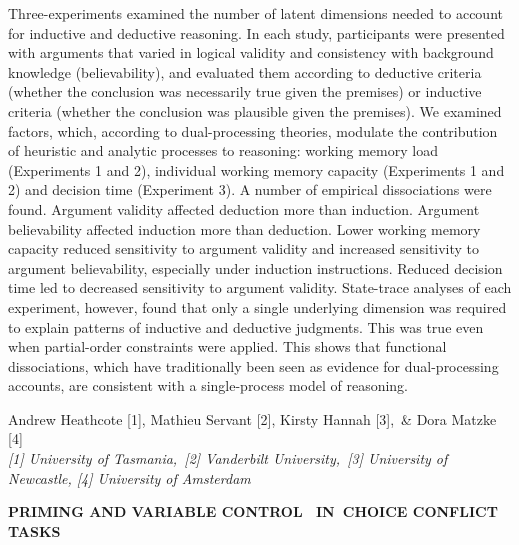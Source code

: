 \documentclass[]{article}
\begin{document}
Three-experiments examined the number of latent dimensions needed to
account for inductive and deductive reasoning. In each study,
participants were presented with arguments that varied in logical
validity and consistency with background knowledge (believability), and
evaluated them according to deductive criteria (whether the conclusion
was necessarily true given the premises) or inductive criteria (whether
the conclusion was plausible given the premises). We examined factors,
which, according to dual-processing theories, modulate the contribution
of heuristic and analytic processes to reasoning: working memory load
(Experiments 1 and 2), individual working memory capacity (Experiments 1
and 2) and decision time (Experiment 3). A number of empirical
dissociations were found. Argument validity affected deduction more than
induction. Argument believability affected induction more than
deduction. Lower working memory capacity reduced sensitivity to argument
validity and increased sensitivity to argument believability, especially
under induction instructions. Reduced decision time led to decreased
sensitivity to argument validity. State-trace analyses of each
experiment, however, found that only a single underlying dimension was
required to explain patterns of inductive and deductive judgments. This
was true even when partial-order constraints were applied. This shows
that functional dissociations, which have traditionally been seen as
evidence for dual-processing accounts, are consistent with a
single-process model of reasoning.\\
\pagebreak  

Andrew Heathcote {[}1{]}, Mathieu Servant {[}2{]}, Kirsty Hannah
{[}3{]},~\& Dora Matzke {[}4{]}\\
\emph{{[}1{]} University of Tasmania,~{[}2{]} Vanderbilt
University,~{[}3{]} University of Newcastle, {[}4{]} University of
Amsterdam}

\textbf{PRIMING AND VARIABLE CONTROL~ IN~CHOICE CONFLICT TASKS}
\end{document}
